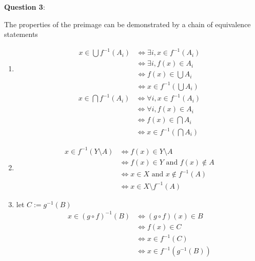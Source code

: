 \documentclass{article} %
\newcommand{\question}[2][]{
  \begin{flushleft}
    \textbf{Question #1}: \textit{#2}

\end{flushleft}}
\begin{document}
\question[3]{}
The properties of the preimage can be demonstrated by a chain of
equivalence statements
\begin{enumerate}
\item
  \begin{align*}
    x \in \bigcup f^{-1}(A_i) &\iff \exists i, x \in f^{-1}(A_i) \\
    &\iff \exists i, f(x) \in A_i \\
    &\iff f(x) \in \bigcup A_i \\
    &\iff x \in f^{-1}(\bigcup A_i)
  \end{align*}
  \begin{align*}
    x \in \bigcap f^{-1}(A_i) &\iff \forall i, x \in f^{-1}(A_i) \\
    &\iff \forall i, f(x) \in A_i \\
    &\iff f(x) \in \bigcap A_i \\
    &\iff x \in f^{-1}(\bigcap A_i)
  \end{align*}
\item
  \begin{align*}
    x \in f^{-1}(Y\setminus A) &\iff f(x) \in Y \setminus A \\
    &\iff f(x) \in Y \text{ and } f(x) \notin A \\
    &\iff x \in X \text{ and } x \notin f^{-1}(A) \\
    &\iff x \in X \setminus f^{-1}(A)
  \end{align*}
\item let $C := g^{-1}(B)$
  \begin{align*}
    x \in (g \circ f)^{-1}(B) &\iff (g \circ f)(x) \in B \\
    &\iff f(x) \in C \\
    &\iff x \in f^{-1}(C) \\
    &\iff x \in f^{-1}(g^{-1}(B))
  \end{align*}
\end{enumerate}
\end{document}
